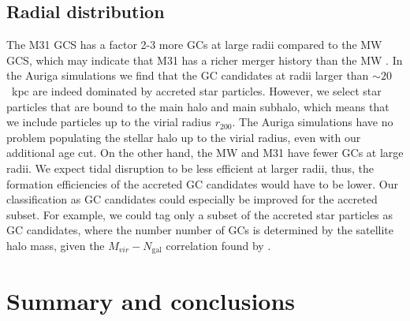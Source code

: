 \documentclass[a4paper,fleqn,usenatbib]{mnras}
\newcommand{\Sun}[0]{\ensuremath{_{\odot}}}
\begin{document}
\subsection{Radial distribution}
\label{sec:discussion_Rgc}
The M31 GCS has a factor 2-3 more GCs at large radii compared to the MW GCS,
which may indicate that M31 has a richer merger history than the MW 
\citep{2016ApJ...824...42C}. In the Auriga simulations we find that the GC 
candidates at radii larger than ${\sim}20$~kpc are indeed dominated by accreted
star particles. However, we select star particles that are bound to the main 
halo and main subhalo, which means that we include particles up to the virial 
radius $r_{200}$. The Auriga simulations have no problem populating the stellar 
halo up to the virial radius, even with our additional age cut. On the other hand, 
the MW and M31 have fewer GCs at large radii. We expect tidal disruption to be
less efficient at larger radii, thus, the formation efficiencies of the accreted 
GC candidates would have to be lower. Our classification as GC candidates could
especially be improved for the accreted subset. For example, we could tag only a
subset of the accreted star particles as GC candidates, where the number
number of GCs is determined by the satellite halo mass, given the 
$M_{vir}-N_{\text{gal}}$ correlation found by \citet{2019arXiv190100900B}.




\section{Summary and conclusions}
\label{sec:conclusions}
\end{document}
